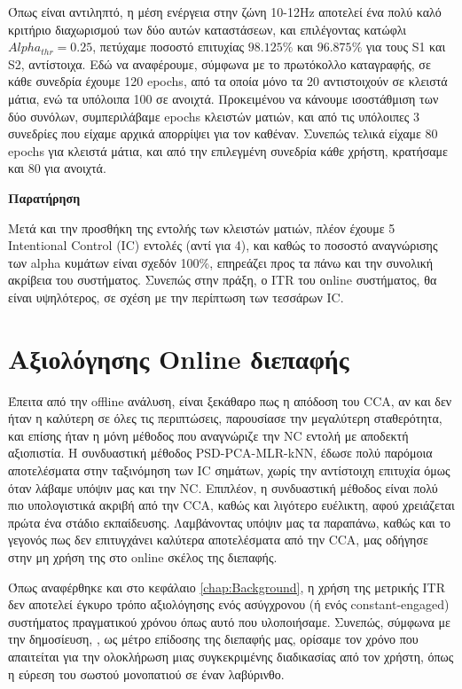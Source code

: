 \documentclass[11pt,a4paper,english,greek,twoside]{../Thesis}
\begin{document}
\par Όπως είναι αντιληπτό, η μέση ενέργεια στην ζώνη 10-12Hz αποτελεί ένα πολύ καλό κριτήριο διαχωρισμού των δύο αυτών καταστάσεων, και επιλέγοντας κατώφλι $Alpha_{thr}=0.25$, πετύχαμε ποσοστό επιτυχίας $98.125\%$ και $96.875\%$ για τους S1 και S2, αντίστοιχα. Εδώ να αναφέρουμε, σύμφωνα με το πρωτόκολλο καταγραφής, σε κάθε συνεδρία έχουμε 120 epochs, από τα οποία μόνο τα 20 αντιστοιχούν σε κλειστά μάτια, ενώ τα υπόλοιπα 100 σε ανοιχτά. Προκειμένου να κάνουμε ισοστάθμιση των δύο συνόλων, συμπεριλάβαμε epochs κλειστών ματιών, και από τις υπόλοιπες 3 συνεδρίες που είχαμε αρχικά απορρίψει για τον καθέναν. Συνεπώς τελικά είχαμε 80 epochs για κλειστά μάτια, και από την επιλεγμένη συνεδρία κάθε χρήστη, κρατήσαμε και 80 για ανοιχτά.

\textbf{Παρατήρηση}
\par Μετά και την προσθήκη της εντολής των κλειστών ματιών, πλέον έχουμε 5 Intentional Control (IC) εντολές (αντί για 4), και καθώς το ποσοστό αναγνώρισης των alpha κυμάτων είναι σχεδόν 100\%, επηρεάζει προς τα πάνω και την συνολική ακρίβεια του συστήματος. Συνεπώς στην πράξη, ο ITR του οnline συστήματος, θα είναι υψηλότερος, σε σχέση με την περίπτωση των τεσσάρων IC.

\section{Αξιολόγησης Online διεπαφής}

\par Έπειτα από την offline ανάλυση, είναι ξεκάθαρο πως η απόδοση του CCA, αν και δεν ήταν η καλύτερη σε όλες τις περιπτώσεις, παρουσίασε την μεγαλύτερη σταθερότητα, και επίσης ήταν η μόνη μέθοδος που αναγνώριζε την NC εντολή με αποδεκτή αξιοπιστία. Η συνδυαστική μέθοδος PSD-PCA-MLR-kNN, έδωσε πολύ παρόμοια αποτελέσματα στην ταξινόμηση των IC σημάτων, χωρίς την αντίστοιχη επιτυχία όμως όταν λάβαμε υπόψιν μας και την NC. Επιπλέον, η συνδυαστική μέθοδος είναι πολύ πιο υπολογιστικά ακριβή από την CCA, καθώς και λιγότερο ευέλικτη, αφού χρειάζεται πρώτα ένα στάδιο εκπαίδευσης. Λαμβάνοντας υπόψιν μας τα παραπάνω, καθώς και το γεγονός πως δεν επιτυγχάνει καλύτερα αποτελέσματα από την CCA, μας οδήγησε στην μη χρήση της στο online σκέλος της διεπαφής.

\par Όπως αναφέρθηκε και στο κεφάλαιο \ref{chap:Background}, η χρήση της μετρικής ITR δεν αποτελεί έγκυρο τρόπο αξιολόγησης ενός ασύγχρονου (ή ενός constant-engaged) συστήματος πραγματικού χρόνου όπως αυτό που υλοποιήσαμε. Συνεπώς, σύμφωνα με την δημοσίευση, \cite{Yuan2013-jp}, ως μέτρο επίδοσης της διεπαφής μας, ορίσαμε τον χρόνο που απαιτείται για την ολοκλήρωση μιας συγκεκριμένης διαδικασίας από τον χρήστη, όπως η εύρεση του σωστού μονοπατιού σε έναν λαβύρινθο.
\end{document}

